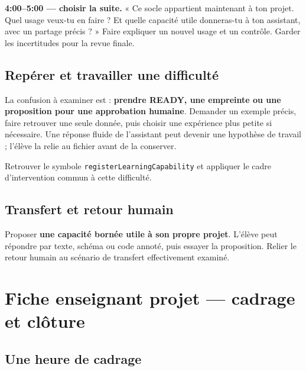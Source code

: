 \documentclass[
  canadien,
  11pt,
  a4paper,
]{report}
\begin{document}
\textbf{4:00--5:00 --- choisir la suite.} « Ce socle appartient
maintenant à ton projet. Quel usage veux-tu en faire ? Et quelle
capacité utile donneras-tu à ton assistant, avec un partage précis ? »
Faire expliquer un nouvel usage et un contrôle. Garder les incertitudes
pour la revue finale.

\section{Repérer et travailler une
difficulté}\label{repuxe9rer-et-travailler-une-difficultuxe9-7}

La confusion à examiner est : \textbf{prendre READY, une empreinte ou
une proposition pour une approbation humaine}. Demander un exemple
précis, faire retrouver une seule donnée, puis choisir une expérience
plus petite si nécessaire. Une réponse fluide de l'assistant peut
devenir une hypothèse de travail ; l'élève la relie au fichier avant de
la conserver.

Retrouver le symbole \texttt{register\allowbreak{}Learning\allowbreak{}Capability} et appliquer le
cadre d'intervention commun à cette difficulté.

\section{Transfert et retour humain}\label{transfert-et-retour-humain-7}

Proposer \textbf{une capacité bornée utile à son propre projet}. L'élève
peut répondre par texte, schéma ou code annoté, puis essayer la
proposition. Relier le retour humain au scénario de transfert
effectivement examiné.

\chapter{Fiche enseignant projet --- cadrage et
clôture}\label{fiche-enseignant-projet-cadrage-et-cluxf4ture}

\section{Une heure de cadrage}\label{une-heure-de-cadrage}
\end{document}
